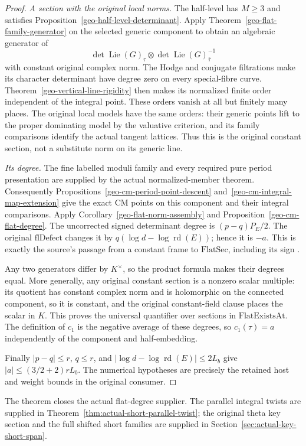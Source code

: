 \begin{proof}
\emph{A section with the original local norms.}
The half-level has $M\ge3$ and satisfies
Proposition~\ref{geo-half-level-determinant}.  Apply
Theorem~\ref{geo-flat-family-generator} on the selected generic
component to obtain an algebraic generator of
\[
      \det\operatorname{Lie}(G)_\tau\otimes
       \det\operatorname{Lie}(G)_{\bar\tau}^{-1}
\]
with constant original complex norm.  The Hodge and conjugate
filtrations make its character determinant have degree zero on
every special-fibre curve.  Theorem~\ref{geo-vertical-line-rigidity}
then makes its normalized finite order independent of the integral
point.  These orders vanish at all but finitely many places.
The original local models have the same orders: their generic
points lift to the proper dominating model by the valuative
criterion, and its family comparisons identify the actual tangent
lattices.  Thus this is the original constant section, not a
substitute norm on its generic line.

\emph{Its degree.}
The fine labelled moduli family and every required pure period
presentation are supplied by
the actual normalized-member theorem\cite{current-construction-record}.  Consequently
Propositions~\ref{geo-cm-period-point-descent}
and~\ref{geo-cm-integral-map-extension} give the exact CM points
on this component and their integral comparisons.  Apply
Corollary~\ref{geo-flat-norm-assembly} and
Proposition~\ref{geo-cm-flat-degree}.  The uncorrected signed
determinant degree is $(p-q)P_E/2$.  The original
$\mathrm{flDefect}$ changes it by
$q(\log d-\log\operatorname{rd}(E))$; hence it is $-a$.
This is exactly the source's passage from a constant frame to
$\mathrm{FlatSec}$, including its sign
\cite{theta-flat-source}.

Any two generators differ by $K^\times$, so the product formula
makes their degrees equal.  More generally, any original constant
section is a nonzero scalar multiple: its quotient has constant
complex norm and is holomorphic on the connected component, so it
is constant, and the original constant-field clause places the
scalar in $K$.  This proves the universal quantifier over sections
in $\mathrm{FlatExistsAt}$.  The definition of $c_1$ is the
negative average of these degrees, so $c_1(\tau)=a$ independently
of the component and half-embedding.

Finally $|p-q|\le r$, $q\le r$, and
$|\log d-\log\operatorname{rd}(E)|\le2L_b$ give
$|a|\le(3/2+2)rL_b$.  The numerical hypotheses are precisely
the retained host and weight bounds in the original consumer.
\end{proof}

The theorem closes the actual flat-degree supplier.  The parallel
integral twists are supplied in Theorem~\ref{thm:actual-short-parallel-twist};
the original theta key section and the full shifted short families
are supplied in Section~\ref{sec:actual-key-short-span}.

